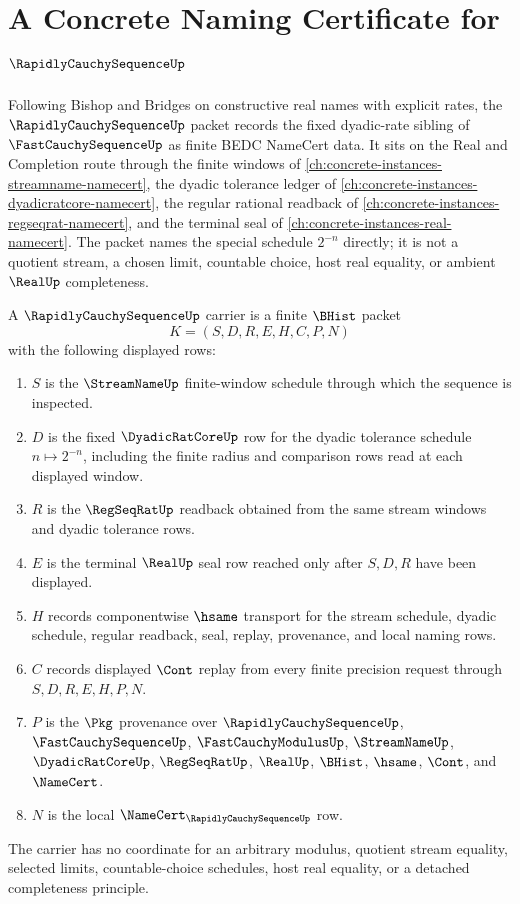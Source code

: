 \chapter{A Concrete Naming Certificate for $\RapidlyCauchySequenceUp$}
\label{ch:concrete-instances-rapidly-cauchy-sequence-namecert}

Following Bishop and Bridges on constructive real names with explicit rates, the $\RapidlyCauchySequenceUp$ packet records the fixed dyadic-rate sibling of $\FastCauchySequenceUp$ as finite BEDC NameCert data. It sits on the Real and Completion route through the finite windows of \autoref{ch:concrete-instances-streamname-namecert}, the dyadic tolerance ledger of \autoref{ch:concrete-instances-dyadicratcore-namecert}, the regular rational readback of \autoref{ch:concrete-instances-regseqrat-namecert}, and the terminal seal of \autoref{ch:concrete-instances-real-namecert}. The packet names the special schedule $2^{-n}$ directly; it is not a quotient stream, a chosen limit, countable choice, host real equality, or ambient $\RealUp$ completeness.

\begin{definition}
\label{def:rapidly-cauchy-sequence-carrier}
A $\RapidlyCauchySequenceUp$ carrier is a finite $\BHist$ packet
$$
K=(S,D,R,E,H,C,P,N)
$$
with the following displayed rows:
\begin{enumerate}
\item $S$ is the $\StreamNameUp$ finite-window schedule through which the sequence is inspected.
\item $D$ is the fixed $\DyadicRatCoreUp$ row for the dyadic tolerance schedule $n \mapsto 2^{-n}$, including the finite radius and comparison rows read at each displayed window.
\item $R$ is the $\RegSeqRatUp$ readback obtained from the same stream windows and dyadic tolerance rows.
\item $E$ is the terminal $\RealUp$ seal row reached only after $S,D,R$ have been displayed.
\item $H$ records componentwise $\hsame$ transport for the stream schedule, dyadic schedule, regular readback, seal, replay, provenance, and local naming rows.
\item $C$ records displayed $\Cont$ replay from every finite precision request through $S,D,R,E,H,P,N$.
\item $P$ is the $\Pkg$ provenance over $\RapidlyCauchySequenceUp$, $\FastCauchySequenceUp$, $\FastCauchyModulusUp$, $\StreamNameUp$, $\DyadicRatCoreUp$, $\RegSeqRatUp$, $\RealUp$, $\BHist$, $\hsame$, $\Cont$, and $\NameCert$.
\item $N$ is the local $\NameCert_{\RapidlyCauchySequenceUp}$ row.
\end{enumerate}
The carrier has no coordinate for an arbitrary modulus, quotient stream equality, selected limits, countable-choice schedules, host real equality, or a detached completeness principle.
\end{definition}

